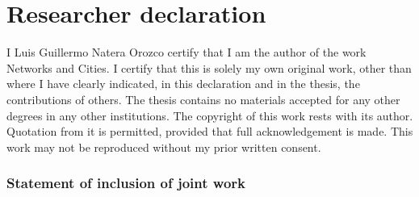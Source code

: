 \documentclass[a4paper,twoside,12pt]{book}
\begin{document}
\chapter*{Researcher declaration}
I Luis Guillermo Natera Orozco certify that I am the author of the work Networks and Cities. I certify that this is solely my own original work, other than where I have clearly indicated, in this declaration and in the thesis, the contributions of others. The thesis contains no materials accepted for any other degrees in any other institutions.  The copyright of this work rests with its author. Quotation from it is permitted, provided that full acknowledgement is made. This work may not be reproduced without my prior written consent. 

\subsection*{Statement of inclusion of joint work}

\vspace{.2cm}



\vspace{.2cm}

\noindent
\end{document}
